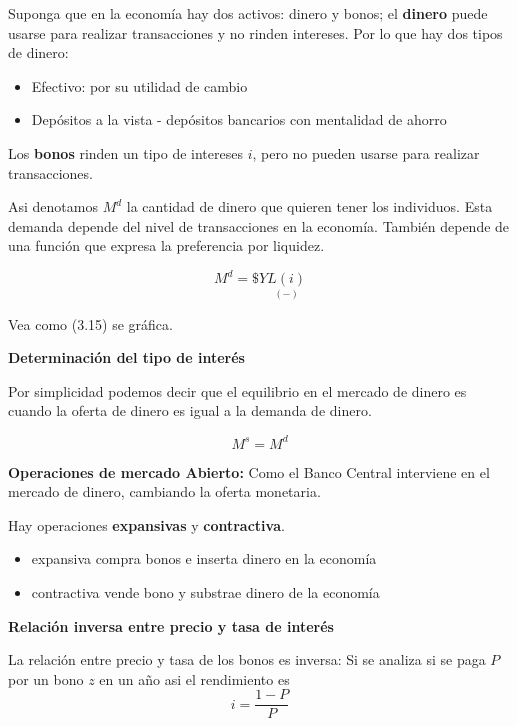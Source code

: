 Suponga que en la economía hay dos activos: dinero y bonos; el \textbf{dinero} puede usarse para realizar transacciones y no rinden intereses. Por lo que hay dos tipos de dinero: \
\begin{itemize}
    \item Efectivo: por su utilidad de cambio
    \item Depósitos a la vista - depósitos bancarios con mentalidad de ahorro
\end{itemize}

Los \textbf{bonos} rinden un tipo de intereses $i$, pero no pueden usarse para realizar transacciones. 

Asi denotamos $M^{d}$ la cantidad de dinero que quieren tener los individuos. Esta demanda depende del nivel de transacciones en la economía. También depende de una función que expresa la preferencia por liquidez. 

\begin{equation}
    M^{d} = \$ Y\underset{(-)}{L(i)}
\end{equation}

Vea como (3.15) se gráfica.

\textbf{Determinación del tipo de interés}

Por simplicidad podemos decir que el equilibrio en el mercado de dinero es cuando la oferta de dinero es igual a la demanda de dinero.

\begin{equation}
    M^{s}=M^{d}
\end{equation}

\textbf{Operaciones de mercado Abierto:} Como el Banco Central interviene en el mercado de dinero, cambiando la oferta monetaria. 

Hay operaciones \textbf{expansivas} y \textbf{contractiva}. 
\begin{itemize}
    \item expansiva compra bonos e inserta dinero en la economía
    \item contractiva vende bono y substrae dinero de la economía
\end{itemize}
 
\textbf{Relación inversa entre precio y tasa de interés}

La relación entre precio y tasa de los bonos es inversa:  Si se analiza si se paga $P$ por un bono $z$ en un año asi el rendimiento es
\begin{equation*}
    i = \frac{1-P}{P}
\end{equation*}

